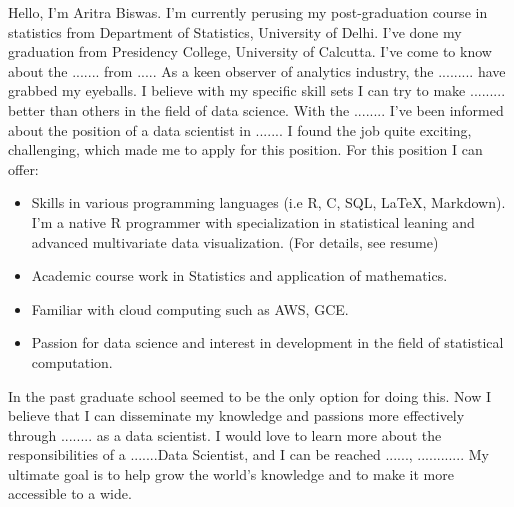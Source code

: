 \documentclass[11pt,a4paper,sans]{moderncv}        %
\begin{document}
Hello, \newline \newline   I'm Aritra Biswas. I'm currently perusing my post-graduation course in statistics from Department of Statistics, University of Delhi. I've done my graduation from Presidency College, University of Calcutta. \newline
I've come to know about the ....... from ..... As a keen observer of analytics industry, the ......... have grabbed my eyeballs. I believe with my specific skill sets I can try to make ......... better than others in the field of data science. With the ........ I've been informed about the position of a data scientist in ....... I found the job quite exciting, challenging, which made me to apply for this position. For this position I can offer: \newline
\begin{itemize}%
\item Skills in various programming languages (i.e R,  C, SQL, LaTeX, Markdown). I'm a native R programmer with specialization in statistical leaning and advanced multivariate data visualization.  (For details, see resume)
\item Academic course work in Statistics and application of mathematics. 
\item Familiar with cloud computing such as AWS, GCE.
\item Passion for data science and interest in development in the field of statistical computation. 
\end{itemize}

In the past graduate school seemed to be the only option for doing this. Now I believe that I can disseminate my knowledge and passions more effectively through ........ as a data scientist. I would love to learn more about the responsibilities of a .......Data Scientist, and I can be reached ......, ............ My ultimate goal is to help grow the world's knowledge and to make it more accessible to a wide.




\makeletterclosing

\end{document}
